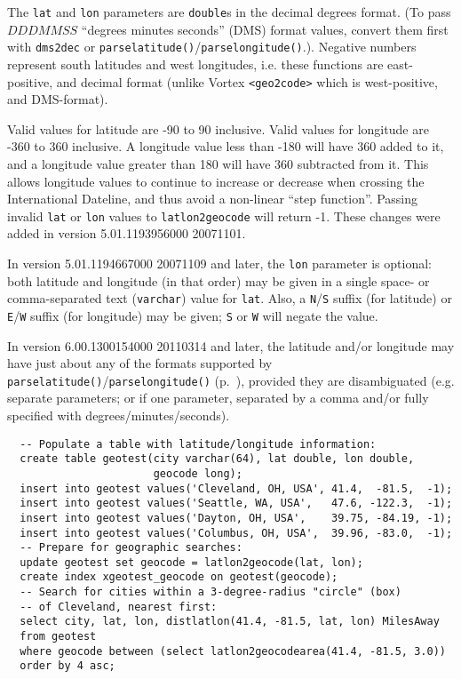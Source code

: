 The \verb`lat` and \verb`lon` parameters are \verb`double`s in the
decimal degrees format.  (To pass $DDDMMSS$ ``degrees minutes
seconds'' (DMS) format values, convert them first with \verb`dms2dec`
or \verb`parselatitude()`/\verb`parselongitude()`.).  Negative numbers
represent south latitudes and west longitudes, i.e. these functions
are east-positive, and decimal format (unlike Vortex \verb`<geo2code>`
which is west-positive, and DMS-format).

Valid values for latitude are -90 to 90 inclusive.  Valid values for
longitude are -360 to 360 inclusive.  A longitude value less than -180
will have 360 added to it, and a longitude value greater than 180 will
have 360 subtracted from it.  This allows longitude values to continue
to increase or decrease when crossing the International Dateline, and
thus avoid a non-linear ``step function''.  Passing invalid \verb`lat`
or \verb`lon` values to \verb`latlon2geocode` will return -1.  These
changes were added in version 5.01.1193956000 20071101.

In version 5.01.1194667000 20071109 and later, the \verb`lon`
parameter is optional: both latitude and longitude (in that order) may
be given in a single space- or comma-separated text (\verb`varchar`)
value for \verb`lat`.  Also, a \verb`N`/\verb`S` suffix (for latitude)
or \verb`E`/\verb`W` suffix (for longitude) may be given; \verb`S` or
\verb`W` will negate the value.

  In version 6.00.1300154000 20110314 and later, the latitude and/or
longitude may have just about any of the formats supported by
\verb`parselatitude()`/\verb`parselongitude()`
(p.~\pageref{parselatitudeSqlFunc}), provided they are disambiguated
(e.g. separate parameters; or if one parameter, separated by a comma
and/or fully specified with degrees/minutes/seconds).

\EXAMPLE
\begin{samepage}
\begin{verbatim}
  -- Populate a table with latitude/longitude information:
  create table geotest(city varchar(64), lat double, lon double,
                       geocode long);
  insert into geotest values('Cleveland, OH, USA', 41.4,  -81.5,  -1);
  insert into geotest values('Seattle, WA, USA',   47.6, -122.3,  -1);
  insert into geotest values('Dayton, OH, USA',    39.75, -84.19, -1);
  insert into geotest values('Columbus, OH, USA',  39.96, -83.0,  -1);
  -- Prepare for geographic searches:
  update geotest set geocode = latlon2geocode(lat, lon);
  create index xgeotest_geocode on geotest(geocode);
  -- Search for cities within a 3-degree-radius "circle" (box)
  -- of Cleveland, nearest first:
  select city, lat, lon, distlatlon(41.4, -81.5, lat, lon) MilesAway
  from geotest
  where geocode between (select latlon2geocodearea(41.4, -81.5, 3.0))
  order by 4 asc;
\end{verbatim}
\end{samepage}

